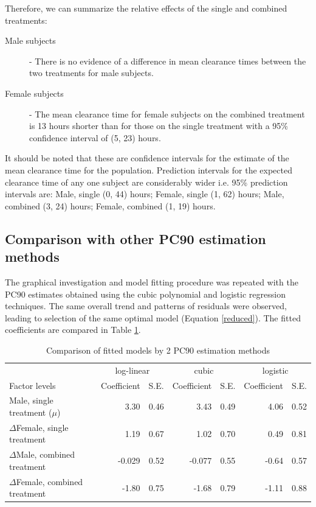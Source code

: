 Therefore, we can summarize the relative effects of the single and combined treatments:
\begin{description}
\item[Male subjects] - There is no evidence of a difference in mean clearance times between the two treatments for male subjects.
\item[Female subjects] - The mean clearance time for female subjects on the combined treatment is 13 hours shorter than for those on the single treatment with a 95\% confidence interval of (5, 23) hours.
\end{description}
It should be noted that these are confidence intervals for the estimate of the mean clearance time for the population. Prediction intervals for the expected clearance time of any one subject are considerably wider i.e. 95\% prediction intervals are: Male, single (0, 44) hours; Female, single (1, 62) hours; Male, combined (3, 24) hours; Female, combined (1, 19) hours.

\subsection{Comparison with other PC90 estimation methods}
The graphical investigation and model fitting procedure was repeated with the PC90 estimates obtained using the cubic polynomial and logistic regression techniques. The same overall trend and patterns of residuals were observed, leading to selection of the same optimal model (Equation \ref{reduced}). The fitted coefficients are compared in Table \ref{compmeth}. 
\begin{table}[h]
\centering
\caption{Comparison of fitted models by 2 PC90 estimation methods}\label{compmeth}
\begin{tabular}{l|rr|rr|rr}
&\multicolumn{2}{c|}{log-linear}&\multicolumn{2}{c|}{cubic}&\multicolumn{2}{c}{logistic}\\
Factor levels&Coefficient&S.E.&Coefficient&S.E.&Coefficient&S.E.\\
\hline
Male, single treatment ($\mu$)			& 3.30 & 0.46 & 3.43 &  0.49 & 4.06 & 0.52\\
$\Delta$Female, single treatment		& 1.19 & 0.67 & 1.02 & 0.70  & 0.49 & 0.81\\
$\Delta$Male, combined treatment		& -0.029 & 0.52 & -0.077 & 0.55 & -0.64 & 0.57\\
$\Delta$Female, combined treatment	& -1.80 & 0.75 & -1.68 & 0.79  & -1.11 & 0.88\\
\hline
\end{tabular}
\end{table}

